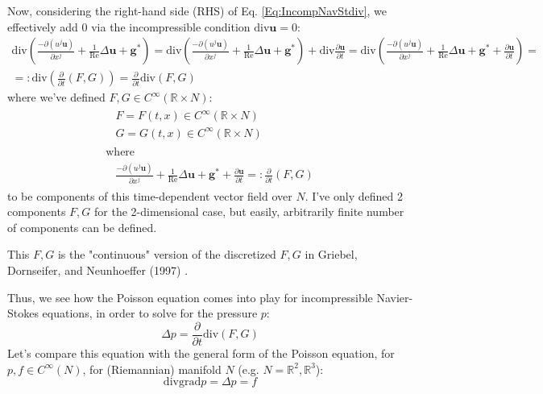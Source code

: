 \documentclass[10pt]{amsart}
\begin{document}
\begin{multicols*}{2}
Now, considering the right-hand side (RHS) of Eq. \ref{Eq:IncompNavStdiv}, we effectively add $0$ via the incompressible condition $\text{div}\mathbf{u}=0$:
\[
\begin{gathered}
	\text{div} \left( \frac{ - \partial (u^j \mathbf{u} ) }{ \partial x^j} + \frac{1}{\text{Re}} \Delta \mathbf{u} + \mathbf{g}^* \right) = \text{div} \left( \frac{ - \partial (u^j \mathbf{u} ) }{ \partial x^j} + \frac{1}{\text{Re}} \Delta \mathbf{u} + \mathbf{g}^* \right) + \text{div} \frac{ \partial \mathbf{u}  }{ \partial t} = \text{div} \left( \frac{ - \partial (u^j \mathbf{u} ) }{ \partial x^j} + \frac{1}{\text{Re}} \Delta \mathbf{u} + \mathbf{g}^* + \frac{ \partial \mathbf{u} }{ \partial t} \right) = \\
=: \text{div} \left( \frac{ \partial }{ \partial t} (F,G) \right) =\frac{ \partial }{ \partial t} \text{div}(F,G)
\end{gathered}
\]
where we've defined $F,G \in C^{\infty}(\mathbb{R}\times N)$:
\begin{equation}
\begin{gathered}
	\begin{aligned}
	& F = F(t,x) \in C^{\infty}(\mathbb{R}\times N) \\ 
	& G = G(t,x) \in C^{\infty}(\mathbb{R}\times N) 
\end{aligned} \\	 \text{ where }  \\
\begin{aligned}
	&  \frac{- \partial (u^j \mathbf{u} ) }{ \partial x^j} + \frac{1}{\text{Re}} \Delta \mathbf{u} + \mathbf{g}^* + \frac{ \partial \mathbf{u} }{ \partial t} =: \frac{ \partial }{ \partial t}(F,G)
\end{aligned}
\end{gathered}
\end{equation}
to be components of this time-dependent vector field over $N$.  I've only defined 2 components $F,G$ for the 2-dimensional case, but easily, arbitrarily finite number of components can be defined.  

This $F,G$ is the "continuous" version of the discretized $F,G$ in  Griebel, Dornseifer, and Neunhoeffer (1997) \cite{GDN1997}.  

Thus, we see how the Poisson equation comes into play for incompressible Navier-Stokes equations, in order to solve for the pressure $p$:
\begin{equation}
\Delta p = \frac{ \partial }{ \partial t} \text{div}(F,G)
\end{equation}
Let's compare this equation with the general form of the Poisson equation, for $p,f\in C^{\infty}(N)$, for (Riemannian) manifold $N$ (e.g. $N=\mathbb{R}^2, \mathbb{R}^3$):
\begin{equation}
\text{div}\text{grad} p = \Delta p = f
\end{equation}


\end{multicols*}
\end{document}
